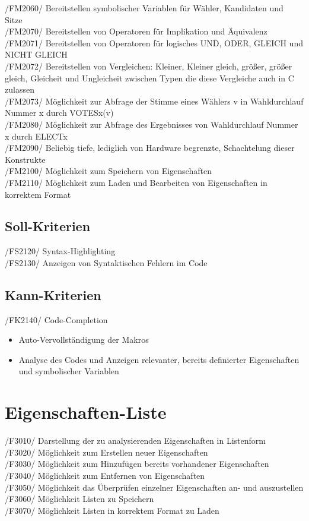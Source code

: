 \documentclass[a4paper]{scrreprt}
\begin{document}
/FM2060/ Bereitstellen symbolischer Variablen für Wähler, Kandidaten und Sitze \\
/FM2070/ Bereitstellen von Operatoren für Implikation und Äquivalenz \\
/FM2071/ Bereitstellen von Operatoren für logisches UND, ODER, GLEICH und NICHT GLEICH \\
/FM2072/ Bereitstellen von Vergleichen: Kleiner, Kleiner gleich, größer, größer gleich,  Gleicheit und Ungleicheit zwischen Typen die diese Vergleiche auch in C zulassen \\
/FM2073/ Möglichkeit zur Abfrage der Stimme eines Wählers v in Wahldurchlauf Nummer x durch VOTESx(v)\\
/FM2080/ Möglichkeit zur Abfrage des Ergebnisses von Wahldurchlauf Nummer x durch ELECTx \\
/FM2090/ Beliebig tiefe, lediglich von Hardware begrenzte, Schachtelung dieser Konstrukte \\
/FM2100/ Möglichkeit zum Speichern von Eigenschaften \\
/FM2110/ Möglichkeit zum Laden und Bearbeiten von Eigenschaften in korrektem Format


\subsection{Soll-Kriterien}
/FS2120/ Syntax-Highlighting \\
/FS2130/ Anzeigen von Syntaktischen Fehlern im Code \\

\subsection{Kann-Kriterien}
/FK2140/ Code-Completion
\begin{itemize}
\item Auto-Vervollständigung der Makros
\item Analyse des Codes und Anzeigen relevanter, bereits definierter Eigenschaften und symbolischer Variablen
\end{itemize}

\section{Eigenschaften-Liste}
/F3010/ Darstellung der zu analysierenden Eigenschaften in Listenform \\
/F3020/ Möglichkeit zum Erstellen neuer Eigenschaften \\
/F3030/ Möglichkeit zum Hinzufügen bereits vorhandener Eigenschaften \\
/F3040/ Möglichkeit zum Entfernen von Eigenschaften \\
/F3050/ Möglichkeit das Überprüfen einzelner Eigenschaften an- und auszustellen \\
/F3060/ Möglichkeit Listen zu Speichern \\
/F3070/ Möglichkeit Listen in korrektem Format zu Laden \\
\end{document}
